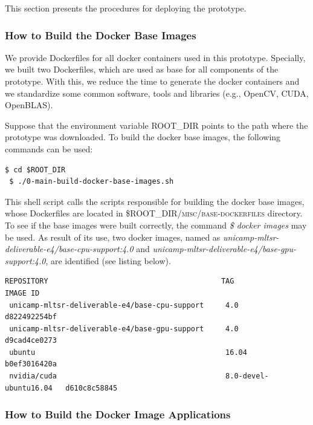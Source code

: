 This section presents the procedures for deploying the prototype.

\subsubsection{How to Build the Docker Base Images}
\label{sec:build-docker-base-images}

We provide Dockerfiles for all docker containers used in this prototype. Specially, we built two Dockerfiles, which are used as base for all components of the prototype. With this, we reduce the time to generate the docker containers and we standardize some common software, tools and libraries (e.g., OpenCV, CUDA, OpenBLAS).

Suppose that the environment variable \textsc{ROOT\_DIR} points to the path where the prototype was downloaded. To build the docker base images, the following commands can be used:
%
\begin{lstlisting}[style=fancyterminal]
 $ cd $ROOT_DIR
 $ ./0-main-build-docker-base-images.sh
\end{lstlisting}

This shell script calls the scripts responsible for building the docker base images, whose Dockerfiles are located in \textsc{\$ROOT\_DIR/misc/base-dockerfiles} directory. To see if the base images were built correctly, the command \emph{\$ docker images} may be used. As result of its use, two docker images, named as \textit{unicamp-mltsr-deliverable-e4/base-cpu-support:4.0} and \textit{unicamp-mltsr-deliverable-e4/base-gpu-support:4.0}, are identified (see listing below).

\begin{lstlisting}[style=fancyterminal]
 REPOSITORY                                        TAG                     IMAGE ID    
 unicamp-mltsr-deliverable-e4/base-cpu-support     4.0                     d822492254bf
 unicamp-mltsr-deliverable-e4/base-gpu-support     4.0                     d9cad4ce0273
 ubuntu                                            16.04                   b0ef3016420a
 nvidia/cuda                                       8.0-devel-ubuntu16.04   d610c8c58845
\end{lstlisting}



\subsubsection{How to Build the Docker Image Applications}
\label{sec:build-docker-image-app}

